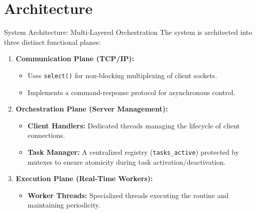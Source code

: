 \section{Architecture}
\begin{frame}{System Architecture: Multi-Layered Orchestration}
    The system is architected into three distinct functional planes:
    \begin{enumerate}
        \item \textbf{Communication Plane (TCP/IP):}
        \begin{itemize}
            \item Uses \texttt{select()} for non-blocking multiplexing of client sockets.
            \item Implements a command-response protocol for asynchronous control.
        \end{itemize}
        \item \textbf{Orchestration Plane (Server Management):}
        \begin{itemize}
            \item \textbf{Client Handlers:} Dedicated threads managing the lifecycle of client connections.
            \item \textbf{Task Manager:} A centralized registry (\texttt{tasks\_active}) protected by mutexes to ensure atomicity during task activation/deactivation.
        \end{itemize}
        \item \textbf{Execution Plane (Real-Time Workers):}
        \begin{itemize}
            \item \textbf{Worker Threads:} Specialized threads executing the routine and maintaining periodicity.
        \end{itemize}
    \end{enumerate}
\end{frame}

